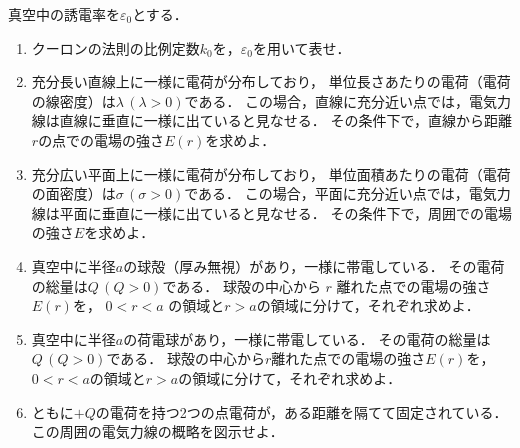 ﻿\documentclass[../../../ps_q.tex]{subfiles}
\begin{document}
真空中の誘電率を$\varepsilon_0$とする．

    \begin{enumerate}
        \item クーロンの法則の比例定数$k_0$を，$\varepsilon_0$を用いて表せ．
        \item 充分長い直線上に一様に電荷が分布しており，%
            単位長さあたりの電荷（電荷の線密度）は$\lambda \, (\lambda>0)$である．%
            この場合，直線に充分近い点では，電気力線は直線に垂直に一様に出ていると見なせる．%
            その条件下で，直線から距離$r$の点での電場の強さ$E(r)$を求めよ．
        \item 充分広い平面上に一様に電荷が分布しており，%
            単位面積あたりの電荷（電荷の面密度）は$\sigma \, (\sigma>0)$である．%
            この場合，平面に充分近い点では，電気力線は平面に垂直に一様に出ていると見なせる．%
            その条件下で，周囲での電場の強さ$E$を求めよ．
        \item 真空中に半径$a$の球殻（厚み無視）があり，一様に帯電している．%
            その電荷の総量は$Q \, (Q>0)$である．%
            球殻の中心から $r$ 離れた点での電場の強さ$E(r)$を，%
            $0<r<a$ の領域と$r>a$の領域に分けて，それぞれ求めよ．
        \item 真空中に半径$a$の荷電球があり，一様に帯電している．%
            その電荷の総量は$Q \, (Q>0)$である．%
            球殻の中心から$r$離れた点での電場の強さ$E(r)$を，%
            $0<r<a$の領域と$r>a$の領域に分けて，それぞれ求めよ．
        \item ともに$+Q$の電荷を持つ2つの点電荷が，ある距離を隔てて固定されている．%
            この周囲の電気力線の概略を図示せよ．
    \end{enumerate}
\end{document}
